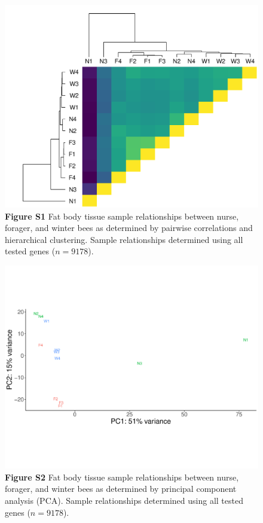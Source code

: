 \documentclass[12pt]{article}
\begin{document}
\maketitle

\pagebreak

\begin{figure}[ht]
    \centering
		\includegraphics[width=0.75\linewidth]{figs1.pdf} 
    \caption*{\textbf{Figure S1} \quad Fat body tissue sample relationships between nurse, forager, and winter bees as determined by pairwise correlations and hierarchical clustering. Sample relationships determined using all tested genes ($n=9178$).}
    \label{fig:S1}
\end{figure}

\pagebreak

\begin{figure}[ht]
    \centering
		\includegraphics[width=0.75\linewidth]{figs2.pdf} 
    \caption*{\textbf{Figure S2} \quad Fat body tissue sample relationships between nurse, forager, and winter bees as determined by principal component analysis (PCA). Sample relationships determined using all tested genes ($n=9178$).}
    \label{fig:S2}
\end{figure}
\end{document}
